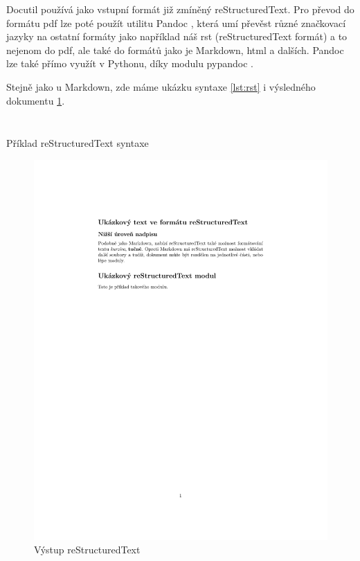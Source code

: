  \cite{docutil}
Docutil používá jako vstupní formát již zmíněný reStructuredText. Pro převod do formátu \gls{pdf} lze poté použít utilitu Pandoc \cite{pandocSW}, která umí převěst různé značkovací jazyky
na ostatní formáty jako například náš rst (reStructuredText formát) a to nejenom do \gls{pdf}, ale také do formátů jako je Markdown, \gls{html} a dalších.
Pandoc lze také přímo využít v Pythonu, díky modulu pypandoc \cite{pypandocSW}.

Stejně jako u Markdown, zde máme ukázku syntaxe \ref{lst:rst} i výsledného dokumentu \ref{fig:rstOutput}.

\begin{listing}[ht]
    \inputminted[linenos,breaklines]{rst}{example-rst.rst}
    \inputminted[linenos,breaklines]{rst}{module.rst}
    \caption{Příklad reStructuredText syntaxe}
    \label{lst:rst}
\end{listing}

\begin{figure}[h]
    \centering
    \includegraphics[width=\textwidth]{example-rst.pdf}
    \caption{Výstup reStructuredText}
    \label{fig:rstOutput}
\end{figure}

